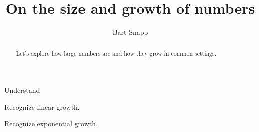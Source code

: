 \documentclass[handout,nooutcomes,noauthor]{ximera}
\title{On the size and growth of numbers}
\author{Bart Snapp}
\begin{document}
\begin{abstract}
  Let's explore how large numbers are and how they grow in common
  settings.
\end{abstract}
\maketitle


\begin{listSectionOutcomes}
\item Understand 
\item Recognize linear growth.
\item Recognize exponential growth.
\item 
\end{listSectionOutcomes}
\end{document}
